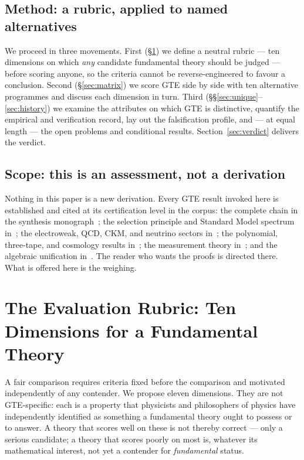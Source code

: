 \documentclass[11pt]{article}
\begin{document}
\subsection{Method: a rubric, applied to named alternatives}

We proceed in three movements.  First (§\ref{sec:rubric}) we define a neutral
rubric --- ten dimensions on which \emph{any} candidate fundamental theory should
be judged --- before scoring anyone, so the criteria cannot be reverse-engineered
to favour a conclusion.  Second (§\ref{sec:matrix}) we score GTE side by side with
ten alternative programmes and discuss each dimension in turn.  Third
(§§\ref{sec:unique}--\ref{sec:history}) we examine the attributes on which GTE is
distinctive, quantify the empirical and verification record, lay out the
falsification profile, and --- at equal length --- the open problems and
conditional results.  Section~\ref{sec:verdict} delivers the verdict.

\subsection{Scope: this is an assessment, not a derivation}

Nothing in this paper is a new derivation.  Every GTE result invoked here is
established and cited at its certification level in the corpus: the complete chain
in the synthesis monograph~\cite{SpivackGTECompleteFramework}; the selection
principle and Standard Model spectrum in~\cite{SpivackSM,SpivackNEMS05}; the
electroweak, QCD, CKM, and neutrino sectors
in~\cite{SpivackGTEUnification,SpivackGTEQCDStructure,SpivackCKM,SpivackNeutrino};
the polynomial, three-tape, and cosmology results
in~\cite{SpivackGTEPolynomialUFT,SpivackThreeTapeCMCA,SpivackGTECosmology};
the measurement theory in~\cite{SpivackPolynomialTransputation}; and the
algebraic unification in~\cite{SpivackGTEPolynomialWolfram,SpivackPSL27Unification}.
The reader who wants the proofs is directed there.  What is offered here is the
weighing.

\section{The Evaluation Rubric: Ten Dimensions for a Fundamental Theory}
\label{sec:rubric}

A fair comparison requires criteria fixed before the comparison and motivated
independently of any contender.  We propose eleven dimensions.  They are not
GTE-specific: each is a property that physicists and philosophers of physics have
independently identified as something a fundamental theory ought to possess or to
answer.  A theory that scores well on these is not thereby correct --- only a
serious candidate; a theory that scores poorly on most is, whatever its
mathematical interest, not yet a contender for \emph{fundamental} status.
\end{document}
